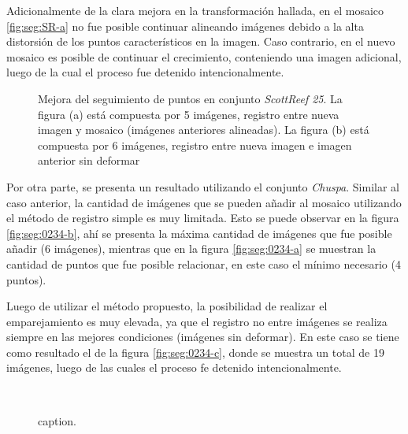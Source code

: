 Adicionalmente de la clara mejora en la transformación hallada, en el mosaico \ref{fig:seg:SR-a} no fue posible continuar alineando imágenes debido a la alta distorsión de los puntos característicos en la imagen. Caso contrario, en el nuevo mosaico es posible de continuar el crecimiento, conteniendo una imagen adicional, luego de la cual el proceso fue detenido intencionalmente. 

\begin{figure}[h]
	\centering     %
	\hspace{1mm}%
	
	\caption[Seguimiento de puntos: \textit{ScottReef 25}]{Mejora del seguimiento de puntos en conjunto \textit{ScottReef 25}. La figura (a) está compuesta por 5 imágenes, registro entre nueva imagen y mosaico (imágenes anteriores alineadas). La figura (b) está compuesta por 6 imágenes, registro entre nueva imagen e imagen anterior sin deformar}
	\label{imagen:seg:SR}
\end{figure}

Por otra parte, se presenta un resultado utilizando el conjunto \textit{Chuspa}. Similar al caso anterior, la cantidad de imágenes que se pueden añadir al mosaico utilizando el método de registro simple es muy limitada. Esto se puede observar en la figura \ref{fig:seg:0234-b}, ahí se presenta la máxima cantidad de imágenes que fue posible añadir (6 imágenes), mientras que en la figura \ref{fig:seg:0234-a} se muestran la cantidad de puntos que fue posible relacionar, en este caso el mínimo necesario (4 puntos). 

Luego de utilizar el método propuesto, la posibilidad de realizar el emparejamiento es muy elevada, ya que el registro no entre imágenes se realiza siempre en las mejores condiciones (imágenes sin deformar). En este caso se tiene como resultado el de la figura \ref{fig:seg:0234-c}, donde se muestra un total de 19 imágenes, luego de las cuales el proceso fe detenido intencionalmente.

\begin{figure}[H]
	\centering
	\begin{varwidth}{0.49\linewidth}  %
		\centering
		\\
	\end{varwidth}
	\begin{varwidth}{0.50\linewidth}  %
		\centering
		\color{white}
		\color{black}
	\end{varwidth}
	
	\caption{caption.} 
	\label{imagen:seg:0234}
\end{figure}


